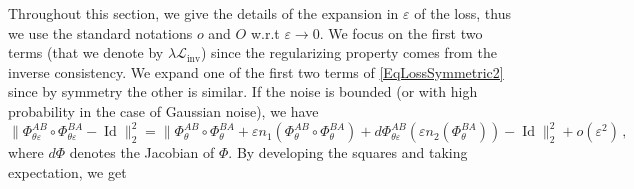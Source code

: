\documentclass[10pt,onecolumn,letterpaper]{article} %
\newcommand{\fxpsi}{\Phi_{\theta}^{BA}}
\newcommand{\fxvarphi}{\Phi_{\theta}^{AB}}
\newcommand{\fxpsivarepsilon}{\Phi_{\theta \varepsilon}^{BA}}
\newcommand{\fxvarphivarepsilon}{\Phi_{\theta \varepsilon}^{AB}}
\begin{document}
%
%
%
%
Throughout this section, we give the details of the expansion in $\varepsilon$ of the loss, thus we use the standard notations $o$ and $O$ w.r.t $\varepsilon \rightarrow 0$.
We focus on the first two terms (that we denote by $\lambda \mathcal{L}_{\text{inv}}$) since the regularizing property comes from the inverse consistency.
We expand one of the first two terms  of \eqref{EqLossSymmetric2} since by symmetry the other is similar. If the noise is bounded (or with high probability in the case of Gaussian noise), we have
\begin{equation}
  \| \fxvarphivarepsilon \circ \fxpsivarepsilon - \operatorname{Id} \|^2_2 =   \| \fxvarphi \circ \fxpsi + \varepsilon n_1(\fxvarphi \circ \fxpsi)  + d\fxvarphivarepsilon(\varepsilon n_2(\fxpsi)) - \operatorname{Id}\|^2_2 + o(\varepsilon^2)\,,
\end{equation}
where $d\Phi$ denotes the Jacobian of $\Phi$. By developing the squares and taking expectation, we get 
\end{document}
